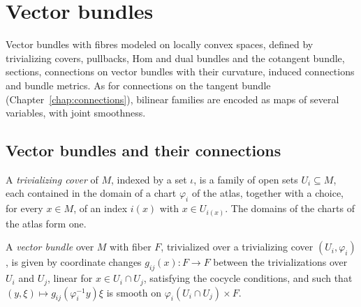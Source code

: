 \chapter{Vector bundles}
\label{chap:bundles}

Vector bundles with fibres modeled on locally convex spaces, defined by trivializing covers,
pullbacks, Hom and dual bundles and the cotangent bundle, sections, connections on vector bundles
with their curvature, induced connections and bundle metrics. As for connections on the tangent
bundle (Chapter~\ref{chap:connections}), bilinear families are encoded as maps of several
variables, with joint smoothness.

\section{Vector bundles and their connections}
\label{sec:vector-bundles}

\begin{definition}
  \label{def:trivialization-cover}
  \leanok
  A \emph{trivializing cover} of $M$, indexed by a set $\iota$, is a family of open sets
  $U_i \subseteq M$, each contained in the domain of a chart $\varphi_i$ of the atlas, together
  with a choice, for every $x \in M$, of an index $i(x)$ with $x \in U_{i(x)}$. The domains of
  the charts of the atlas form one.
\end{definition}

\begin{definition}
  \label{def:vector-bundle}
  \leanok
  A \emph{vector bundle} over $M$ with fiber $F$, trivialized over a trivializing cover
  $(U_i, \varphi_i)$, is given by coordinate changes $g_{ij}(x) \colon F \to F$ between the
  trivializations over $U_i$ and $U_j$, linear for $x \in U_i \cap U_j$, satisfying the cocycle
  conditions, and such that $(y, \xi) \mapsto g_{ij}(\varphi_i^{-1} y)\xi$ is smooth on
  $\varphi_i(U_i \cap U_j) \times F$.
\end{definition}

